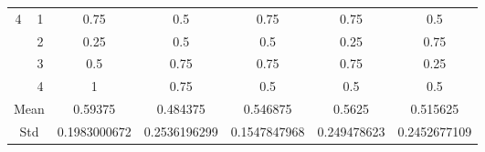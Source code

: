 \documentclass[draft,dvipsnames]{drexel-thesis}
\begin{document}
\begin{thesis}
\begin{table}[!t]
\begin{tabular}{|c|c|c|c|c|c|c|}
\multirow{4}{*}{4}    & 1                   & 0.75         & 0.5          & 0.75         & 0.75        & 0.5          \\ \cline{2-7} 
                      & 2                   & 0.25         & 0.5          & 0.5          & 0.25        & 0.75         \\ \cline{2-7} 
                      & 3                   & 0.5          & 0.75         & 0.75         & 0.75        & 0.25         \\ \cline{2-7} 
                      & 4                   & 1            & 0.75         & 0.5          & 0.5         & 0.5          \\ \hline
\multicolumn{2}{|c|}{Mean}                  & 0.59375      & 0.484375     & 0.546875     & 0.5625      & 0.515625     \\ \hline
\multicolumn{2}{|c|}{Std}                   & 0.1983000672 & 0.2536196299 & 0.1547847968 & 0.249478623 & 0.2452677109 \\ \hline
\end{tabular}
\end{table}


\end{thesis}
\end{document}
